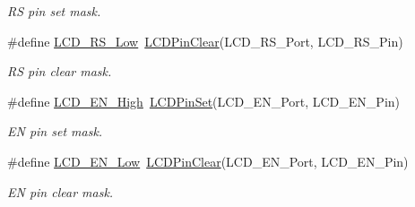 \begin{DoxyCompactItemize}
\begin{DoxyCompactList}\small\item\em R\-S pin set mask. \end{DoxyCompactList}\item 
\hypertarget{group__lcd__h_ga0b24c06c65241a0e59d9c53807e41317}{\#define \hyperlink{group__lcd__h_ga0b24c06c65241a0e59d9c53807e41317}{L\-C\-D\-\_\-\-R\-S\-\_\-\-Low}~\hyperlink{group__lcd__h_ga1279c3be6e3b6cefa1b1bee2325c8f93}{L\-C\-D\-Pin\-Clear}(L\-C\-D\-\_\-\-R\-S\-\_\-\-Port, L\-C\-D\-\_\-\-R\-S\-\_\-\-Pin)}\label{group__lcd__h_ga0b24c06c65241a0e59d9c53807e41317}

\begin{DoxyCompactList}\small\item\em R\-S pin clear mask. \end{DoxyCompactList}\item 
\hypertarget{group__lcd__h_gaa5646c9467f205fa5d9ae2f35037e222}{\#define \hyperlink{group__lcd__h_gaa5646c9467f205fa5d9ae2f35037e222}{L\-C\-D\-\_\-\-E\-N\-\_\-\-High}~\hyperlink{group__lcd__h_ga3bc70b31cd1ab9a95b44befeca6f4f42}{L\-C\-D\-Pin\-Set}(L\-C\-D\-\_\-\-E\-N\-\_\-\-Port, L\-C\-D\-\_\-\-E\-N\-\_\-\-Pin)}\label{group__lcd__h_gaa5646c9467f205fa5d9ae2f35037e222}

\begin{DoxyCompactList}\small\item\em E\-N pin set mask. \end{DoxyCompactList}\item 
\hypertarget{group__lcd__h_gab54604df26d503464f08a6340307989b}{\#define \hyperlink{group__lcd__h_gab54604df26d503464f08a6340307989b}{L\-C\-D\-\_\-\-E\-N\-\_\-\-Low}~\hyperlink{group__lcd__h_ga1279c3be6e3b6cefa1b1bee2325c8f93}{L\-C\-D\-Pin\-Clear}(L\-C\-D\-\_\-\-E\-N\-\_\-\-Port, L\-C\-D\-\_\-\-E\-N\-\_\-\-Pin)}\label{group__lcd__h_gab54604df26d503464f08a6340307989b}

\begin{DoxyCompactList}\small\item\em E\-N pin clear mask. \end{DoxyCompactList}\end{DoxyCompactItemize}
